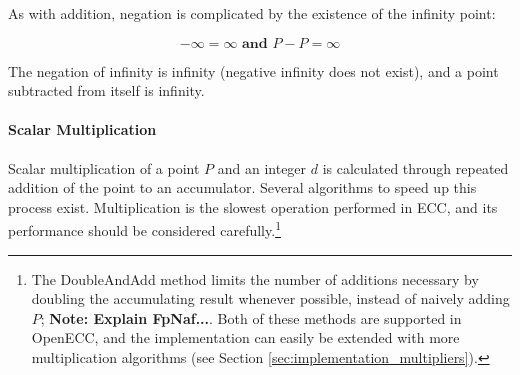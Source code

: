 As with addition, negation is complicated by the existence of the infinity point:

\begin{equation}
	-\infty = \infty \textbf{ and } P - P = \infty
\end{equation}

The negation of infinity is infinity (negative infinity does not exist), and a point subtracted from itself is infinity.\cite{hankerson2010}

\paragraph{Scalar Multiplication}

Scalar multiplication of a point \(P\) and an integer \(d\) is calculated through repeated addition of the point to an accumulator.
Several algorithms to speed up this process exist. Multiplication is the slowest operation performed in ECC, and its performance should
be considered carefully.\footnote{The DoubleAndAdd method limits the number of additions necessary by doubling the accumulating result
whenever possible, instead of naively adding \(P\); \textbf{Note: Explain FpNaf...}. Both of these methods are supported in OpenECC, and
the implementation can easily be extended with more multiplication algorithms (see Section \ref{sec:implementation_multipliers}).}